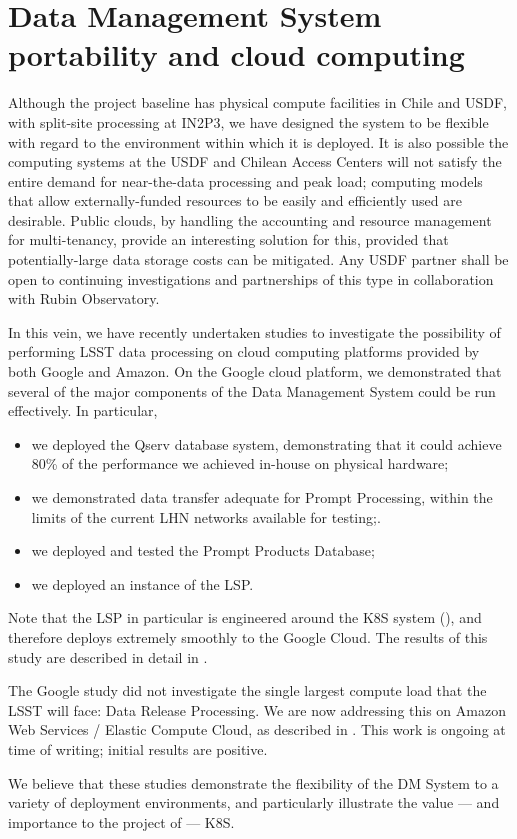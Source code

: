 \section{Data Management System portability and cloud computing}
\label{sec:studies}

Although the project baseline has physical compute facilities in Chile and \gls{USDF}, with split-site processing at \gls{IN2P3}, we have designed the system to be flexible with regard to the environment within which it is deployed.
It is also possible the computing systems at the \gls{USDF} and Chilean Access Centers will not satisfy the entire demand for near-the-data processing and peak load; computing models that allow externally-funded resources to be easily and efficiently used are desirable.
Public clouds, by handling the accounting and resource management for multi-tenancy, provide an interesting solution for this, provided that potentially-large data storage costs can be mitigated. Any \gls{USDF} partner shall be open to continuing investigations and partnerships of this type in collaboration with
Rubin Observatory.

In this vein, we have recently undertaken studies to investigate the possibility of performing \gls{LSST} data processing on cloud computing platforms provided by both Google and Amazon.
On the Google cloud platform, we demonstrated that several of the major components of the \gls{Data Management System} could be run effectively.
In particular,

\begin{itemize}

  \item{we deployed the \gls{Qserv} database system, demonstrating that it could achieve 80\% of the performance we achieved in-house on physical hardware;}

  \item{we demonstrated data transfer adequate for \gls{Prompt Processing}, within the limits of the current \gls{LHN} networks available for testing;}.

  \item{we deployed and tested the Prompt Products Database;}

  \item{we deployed an instance of the \gls{LSP}.}

\end{itemize}

Note that the \gls{LSP} in particular is engineered around the \gls{K8S} system (), and therefore deploys extremely smoothly to the Google Cloud.
The results of this study are described in detail in .

The Google study did not investigate the single largest compute load that the \gls{LSST} will face: \gls{Data Release Processing}.
We are now addressing this on Amazon Web Services / Elastic Compute Cloud, as described in .
This work is ongoing at time of writing; initial results are positive.

We believe that these studies demonstrate the flexibility of the \gls{DM} System to a variety of deployment environments, and particularly illustrate the value --- and importance to the project of --- \gls{K8S}.

